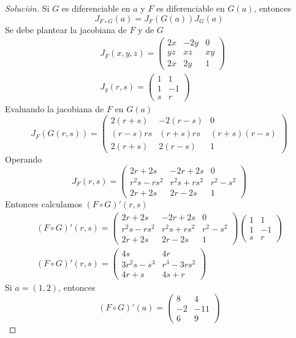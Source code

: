 \documentclass[a4,11pt]{aleph-notas}
\begin{document}
\begin{proof}[Solución]
Si $G$ es diferenciable en $a$ y $F$ es diferenciable en $G(a)$, entonces
    \[ 
        J_{F\circ G} (a)= J_F (G(a))J_G (a)
    \]
    Se debe plantear la jacobiana de $F$ y de $G$
    \begin{align*}
        &J_F(x,y,z) = \begin{pmatrix}
        2x & -2y & 0 \\
        yz & xz & xy\\
        2x & 2y & 1
        \end{pmatrix}\\
        &J_g(r,s) = \begin{pmatrix}
        1 & 1  \\
        1 & -1 \\
        s & r
        \end{pmatrix}
    \end{align*}
    Evaluando la jacobiana de $F$ en $G(a)$
    \[ 
        J_F(G(r,s)) = \begin{pmatrix}
        2(r+s) & -2(r-s) & 0 \\
        (r-s)rs & (r+s)rs & (r+s)(r-s)\\
        2(r+s) & 2(r-s) & 1
        \end{pmatrix}
    \]
    Operando
    \[ 
        J_F(r,s) = \begin{pmatrix}
        2r+2s & -2r+2s & 0 \\
        r^2s-rs^2 & r^2s+rs^2 & r^2-s^2\\
        2r+2s & 2r-2s & 1
        \end{pmatrix}
	\]
    Entonces calculamos $(F\circ G)'(r,s)$ 
    \begin{align*}
        (F\circ G)'(r,s)= \begin{pmatrix}
        2r+2s & -2r+2s & 0 \\
        r^2s-rs^2 & r^2s+rs^2 & r^2-s^2\\
        2r+2s & 2r-2s & 1
        \end{pmatrix} \begin{pmatrix}
        1 & 1  \\
        1 & -1 \\
        s & r
        \end{pmatrix}\\
	    (F\circ G)'(r,s)= \begin{pmatrix}
        4s & 4r \\
        3r^2s-s^3 & r^3-3rs^2\\
        4r+s & 4s+r
        \end{pmatrix}
    \end{align*} 
    Si $a=(1,2)$, entonces
    \[ 
        (F\circ G)'(a)= \begin{pmatrix}
        8 & 4 \\
        -2 & -11\\
        6 & 9
        \end{pmatrix}
    \]
\end{proof}
\end{document}
